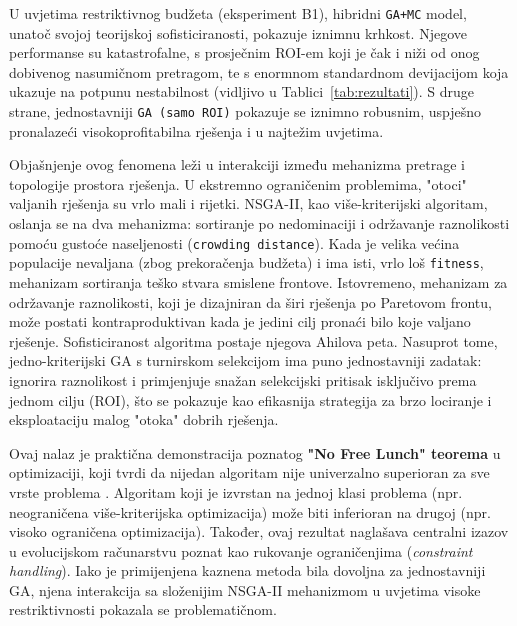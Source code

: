 U uvjetima restriktivnog budžeta (eksperiment B1), hibridni \texttt{GA+MC} model, unatoč svojoj teorijskoj sofisticiranosti, pokazuje iznimnu krhkost. Njegove performanse su katastrofalne, s prosječnim ROI-em koji je čak i niži od onog dobivenog nasumičnom pretragom, te s enormnom standardnom devijacijom koja ukazuje na potpunu nestabilnost (vidljivo u Tablici~\ref{tab:rezultati}). S druge strane, jednostavniji \texttt{GA (samo ROI)} pokazuje se iznimno robusnim, uspješno pronalazeći visokoprofitabilna rješenja i u najtežim uvjetima.

Objašnjenje ovog fenomena leži u interakciji između mehanizma pretrage i topologije prostora rješenja. U ekstremno ograničenim problemima, "otoci" valjanih rješenja su vrlo mali i rijetki. NSGA-II, kao više-kriterijski algoritam, oslanja se na dva mehanizma: sortiranje po nedominaciji i održavanje raznolikosti pomoću gustoće naseljenosti (\texttt{crowding distance}). Kada je velika većina populacije nevaljana (zbog prekoračenja budžeta) i ima isti, vrlo loš \texttt{fitness}, mehanizam sortiranja teško stvara smislene frontove. Istovremeno, mehanizam za održavanje raznolikosti, koji je dizajniran da širi rješenja po Paretovom frontu, može postati kontraproduktivan kada je jedini cilj pronaći bilo koje valjano rješenje. Sofisticiranost algoritma postaje njegova Ahilova peta. Nasuprot tome, jedno-kriterijski GA s turnirskom selekcijom ima puno jednostavniji zadatak: ignorira raznolikost i primjenjuje snažan selekcijski pritisak isključivo prema jednom cilju (ROI), što se pokazuje kao efikasnija strategija za brzo lociranje i eksploataciju malog "otoka" dobrih rješenja.

Ovaj nalaz je praktična demonstracija poznatog \textbf{"No Free Lunch" teorema} u optimizaciji, koji tvrdi da nijedan algoritam nije univerzalno superioran za sve vrste problema \cite{Wolpert1997}. Algoritam koji je izvrstan na jednoj klasi problema (npr. neograničena više-kriterijska optimizacija) može biti inferioran na drugoj (npr. visoko ograničena optimizacija). Također, ovaj rezultat naglašava centralni izazov u evolucijskom računarstvu poznat kao rukovanje ograničenjima (\textit{constraint handling}). Iako je primijenjena kaznena metoda bila dovoljna za jednostavniji GA, njena interakcija sa složenijim NSGA-II mehanizmom u uvjetima visoke restriktivnosti pokazala se problematičnom.


